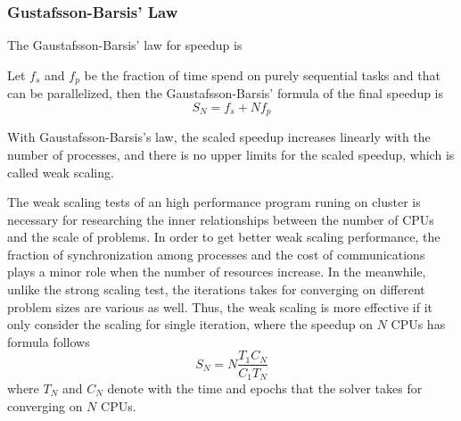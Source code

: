 \subsubsection{Gustafsson-Barsis' Law}
The Gaustafsson-Barsis' law for speedup is 
\begin{theorem}\label{THEO:GaustafssonLaw}
  Let $f_s$ and $f_p$ be the fraction of time spend on purely sequential tasks and that can be parallelized, then 
  the Gaustafsson-Barsis' formula 
                                                        \cite{GaustafssonLaw}
  of the final speedup is 
  \begin{equation}\label{EQ:GaustafssonLaw}
    S_N = f_s + Nf_p
  \end{equation}
\end{theorem}
With Gaustafsson-Barsis's law, the scaled speedup increases linearly with the number of processes, and there is no upper 
limits for the scaled speedup, which is called weak scaling.

The weak scaling tests of an high performance program runing on cluster is necessary for researching the inner relationships 
between the number of CPUs and the scale of problems.
In order to get better weak scaling performance, the fraction of synchronization among processes and the cost of communications 
plays a minor role when the number of resources increase. 
In the meanwhile, unlike the strong scaling test, the iterations takes for converging on different problem sizes are various as well.
Thus, the weak scaling is more effective if it only consider the scaling for single iteration, where the speedup 
on $N$ CPUs has formula follows
\begin{equation}
  S_N = N\frac{T_1C_N}{C_1T_N} 
\end{equation}
where $T_N$ and $C_N$ denote with the time and epochs that the solver takes for converging on $N$ CPUs.
